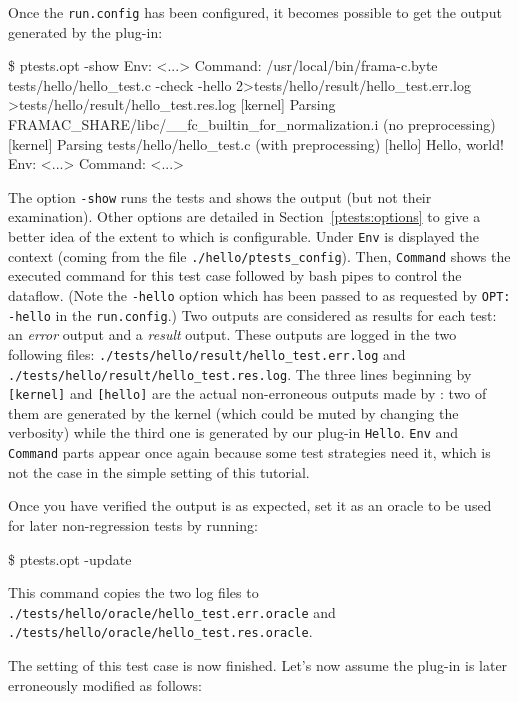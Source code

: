 Once the \texttt{run.config} has been configured, it becomes possible to
get the output generated by the plug-in:
\begin{shell}[breaklines=true]
\$ ptests.opt -show
Env:
<...>
Command:
/usr/local/bin/frama-c.byte tests/hello/hello_test.c -check  -hello 2>tests/hello/result/hello_test.err.log >tests/hello/result/hello_test.res.log
[kernel] Parsing FRAMAC_SHARE/libc/__fc_builtin_for_normalization.i (no preprocessing)
[kernel] Parsing tests/hello/hello_test.c (with preprocessing)
[hello] Hello, world!
Env:
<...>
Command:
<...>
\end{shell}
The option \texttt{-show} runs the tests and shows the output
(but not their examination). Other options are detailed
in Section~\ref{ptests:options} to give a better idea of the
extent to which \ptests is configurable.
Under \texttt{Env} is displayed the context (coming from the file
\texttt{./hello/ptests\_config}).
Then, \texttt{Command} shows the executed command for this test case followed
by bash pipes to control the dataflow. (Note the \texttt{-hello}
option which has been passed to \framac as requested by \texttt{OPT: -hello}
in the \texttt{run.config}.)
Two outputs are considered as results for each test:
an \emph{error} output and a \emph{result} output.
These outputs are logged in the two following files:
\texttt{./tests/hello/result/hello\_test.err.log} and
\texttt{./tests/hello/result/hello\_test.res.log}.
The three lines beginning by \texttt{[kernel]} and \texttt{[hello]}
are the actual non-erroneous outputs made by \framac: two of them are generated
by the kernel (which could be muted by changing the verbosity) while the third
one is generated by our plug-in \texttt{Hello}. \texttt{Env} and
\texttt{Command} parts appear once again because some test strategies need it,
which is not the case in the simple setting of this tutorial.

Once you have verified the output is as expected, set it as an
oracle to be used for later non-regression tests by running:
\begin{shell}
\$ ptests.opt -update
\end{shell}
This command copies the two log files to
\texttt{./tests/hello/oracle/hello\_test.err.oracle} and
\texttt{./tests/hello/oracle/hello\_test.res.oracle}.

The setting of this test case is now finished.
Let's now assume the plug-in is later erroneously modified as follows:


